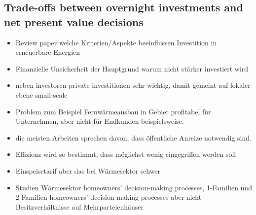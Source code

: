\subsection{Trade-offs between overnight investments and net present value decisions}

\begin{itemize}
	
	\item[\textcolor{col}{\textbullet}] \textcolor{col}{Review paper welche Kriterien/Aspekte beeinflussen Investition in erneuerbare Energien}
	\item[\textcolor{col}{\textbullet}] \textcolor{col}{Finanzielle Unsicherheit der Hauptgrund warum nicht stärker investiert wird}
	\item[\textcolor{col}{\textbullet}] \textcolor{col}{neben investoren private investitionen sehr wichtig, damit gemeint auf lokaler ebene small-scale}
	\item[\textcolor{col}{\textbullet}] \textcolor{col}{Problem zum Beispiel Fernwärmeausbau in Gebiet profitabel für Unternehmen, aber nicht für Endkunden beispielsweise.}
	\item[\textcolor{col}{\textbullet}] \textcolor{col}{die meisten Arbeiten sprechen davon, dass öffentliche Anreize notwendig sind.}
	\item[\textcolor{col}{\textbullet}] \textcolor{col}{Effizienz wird so bestimmt, dass möglichst wenig eingegriffen werden soll}
	\item[\textcolor{col}{\textbullet}] \textcolor{col}{Einspeisetarif aber das bei Wärmesektor schwer}
	\item[\textcolor{col}{\textbullet}] \textcolor{col}{Studien Wärmesektor homeowners’ decision-making processes, 1-Familien und 2-Familien homeowners’ decision-making processes aber nicht Besitzverhältnisse auf Mehrparteienhäuser}
\end{itemize}

